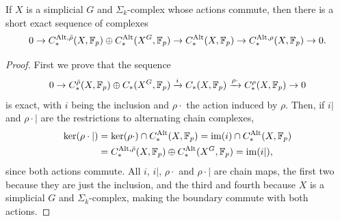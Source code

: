 \documentclass[a4paper,12pt]{amsart}
\begin{document}
\begin{proposition}\label{prop:smith_alt_se_sequence}
    If $X$ is a simplicial $G$ and $\Sigma_k$-complex whose actions commute, then there is a short exact sequence of complexes
    $$0\rightarrow  C_*^{\textnormal{Alt},\bar\rho}(X,\mathbb{F}_p)\oplus C_*^{\textnormal{Alt}}(X^G,\mathbb{F}_p)\rightarrow C_*^{\textnormal{Alt}}(X,\mathbb{F}_p) \rightarrow C_*^{\textnormal{Alt},\rho}(X,\mathbb{F}_p) \rightarrow 0.$$
\end{proposition}
\begin{proof}
    First we prove that the sequence
    \begin{equation}\label{eq:smith_se_sequence}
    0\rightarrow C_*^{\bar\rho}(X,\mathbb{F}_p)\oplus C_*(X^G,\mathbb{F}_p)\xrightarrow{i} C_*(X,\mathbb{F}_p) \xrightarrow{\rho\cdot} C_*^\rho(X,\mathbb{F}_p) \rightarrow 0 
    \end{equation}
    is exact, with $i$ being the inclusion and $\rho\cdot$ the action induced by $\rho$. 
    Then, if $i|$ and $\rho\cdot|$ are the restrictions to alternating chain complexes,
    $$\begin{aligned}
    \ker(\rho\cdot|) &= \ker(\rho\cdot)\cap C_*^{\textnormal{Alt}}(X,\mathbb{F}_p) = \operatorname{im}(i)\cap C_*^{\textnormal{Alt}}(X,\mathbb{F}_p)\\
    &= C_*^{\textnormal{Alt},\bar\rho}(X,\mathbb{F}_p)\oplus C_*^{\textnormal{Alt}}(X^G,\mathbb{F}_p) = \operatorname{im}(i|),
    \end{aligned}$$
    since both actions commute. %
    All $i$, $i|$, $\rho\cdot$ and $\rho\cdot|$ are chain maps, the first two because they are just the inclusion, and the third and fourth because $X$ is a simplicial $G$ and $\Sigma_k$-complex, making the boundary commute with both actions.
    

\end{proof}
\end{document}
